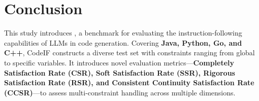 \section{Conclusion}

This study introduces \bench{}, a benchmark for evaluating the instruction-following capabilities of LLMs in code generation. Covering \textbf{Java, Python, Go, and C++}, CodeIF constructs a diverse test set with constraints ranging from global to specific variables. It introduces novel evaluation metrics—\textbf{Completely Satisfaction Rate (CSR), Soft Satisfaction Rate (SSR), Rigorous Satisfaction Rate (RSR), and Consistent Continuity Satisfaction Rate (CCSR)}—to assess multi-constraint handling across multiple dimensions.

